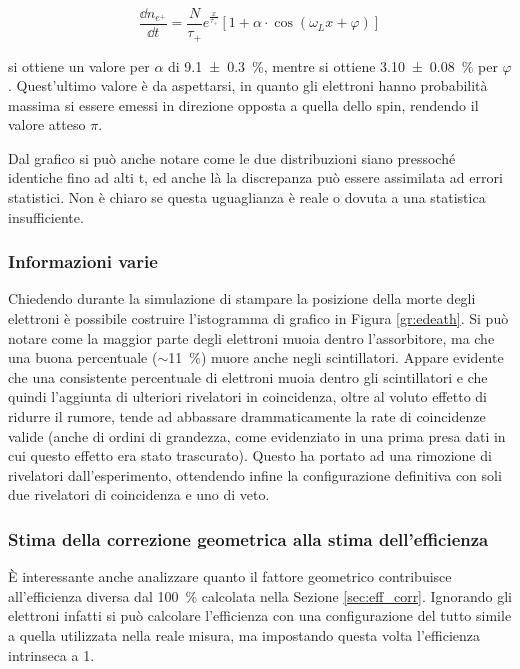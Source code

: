 \begin{equation}
	\frac{\dd n_{e^+}}{\dd t} = \frac{N}{\tau_+}e^{\frac{x}{\tau_+}}\left[1 + \alpha\cdot\cos(\omega_L x + \varphi)\right]
	\label{eq:sim_fit}
\end{equation}

si ottiene un valore per $\alpha$ di \SI{9.1 \pm 0.3}{\percent}, mentre si ottiene \SI{3.10 \pm 0.08}{\percent} per $\varphi$. Quest'ultimo valore \`e da aspettarsi, in quanto gli elettroni hanno probabilit\`a massima si essere emessi in direzione opposta a quella dello spin, rendendo il valore atteso $\pi$.

Dal grafico si pu\`o anche notare come le due distribuzioni siano pressoch\'e identiche fino ad alti t, ed anche l\`a la discrepanza pu\`o essere assimilata ad errori statistici. Non \`e chiaro se questa uguaglianza \`e reale o dovuta a una statistica insufficiente.

\subsubsection{Informazioni varie}
Chiedendo durante la simulazione di stampare la posizione della morte degli elettroni \`e possibile costruire l'istogramma di grafico in Figura \ref{gr:edeath}. Si pu\`o notare come la maggior parte degli elettroni muoia dentro l'assorbitore, ma che una buona percentuale ($\sim$\SI{11}{\percent}) muore anche negli scintillatori.
Appare evidente che una consistente percentuale di elettroni muoia dentro gli scintillatori e che quindi l'aggiunta di ulteriori rivelatori in coincidenza, oltre al voluto effetto di ridurre il rumore, tende ad abbassare drammaticamente la rate di coincidenze valide (anche di ordini di grandezza, come evidenziato in una prima presa dati in cui questo effetto era stato trascurato). Questo ha portato ad una rimozione di rivelatori dall'esperimento, ottendendo infine la configurazione definitiva con soli due rivelatori di coincidenza e uno di veto.


\subsubsection{Stima della correzione geometrica alla stima dell'efficienza}
\`E interessante anche analizzare quanto il fattore geometrico contribuisce all'efficienza diversa dal \SI{100}{\percent} calcolata nella Sezione \ref{sec:eff_corr}. Ignorando gli elettroni infatti si pu\`o calcolare l'efficienza con una configurazione del tutto simile a quella utilizzata nella reale misura, ma impostando questa volta l'efficienza intrinseca a 1.

